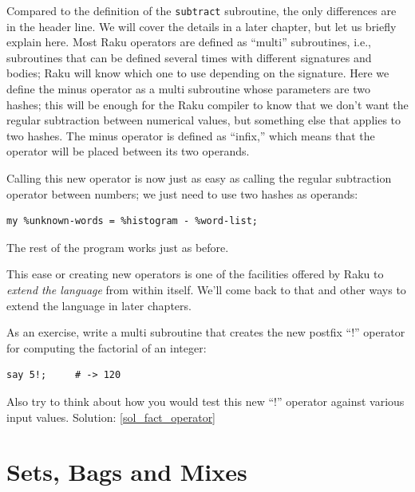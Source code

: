 
Compared to the definition of the {\tt subtract} subroutine, the 
only differences are in the header line. We will cover the 
details in a later chapter, but let us briefly explain here.
Most Raku operators are defined as ``multi'' subroutines, 
i.e., subroutines that can be defined several times with 
different signatures and bodies; Raku will know which one to use depending 
on the signature. Here we define the minus operator as a 
multi subroutine whose parameters are two hashes; this will be 
enough for the Raku compiler to know that we don't want 
the regular subtraction between numerical values, but something 
else that applies to two hashes. The minus operator is defined as 
``infix,'' which means that the operator will be placed 
between its two operands.

Calling this new operator is now just as easy as calling 
the regular subtraction operator between numbers; we just need 
to use two hashes as operands:

\begin{verbatim}
my %unknown-words = %histogram - %word-list;
\end{verbatim}

The rest of the program works just as before.

This ease or creating new operators is one of the facilities 
offered by Raku to \emph{extend the language} from within itself. 
We'll come back to that and other ways to extend the language 
in later chapters.

\label{fact_operator}
As an exercise, write a multi subroutine that creates the new 
postfix ``!'' operator for computing the factorial of an integer:

\begin{verbatim}
say 5!;     # -> 120
\end{verbatim}
%
Also try to think about how you would test this new ``!'' operator 
against various input values.
Solution: \ref{sol_fact_operator}


\section{Sets, Bags and Mixes}
\label{sets_and_bags}


